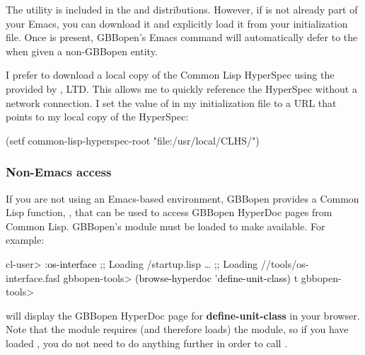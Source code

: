 \documentclass[10pt,twoside,english,pdftex]{article}
\begin{document}
The
utility is included in the
 and
 distributions.
However, if  is not already part of your Emacs, you
can download it and explicitly load it from your  initialization
file.  Once  is present, GBBopen's
 Emacs command will automatically defer to the
 when given a
non-GBBopen entity.

I prefer to download a local copy of the Common Lisp HyperSpec using the
provided by , LTD.  This allows
me to quickly reference the HyperSpec without a network connection.  I set the
value of  in my 
initialization file to a URL that points to my local copy of the HyperSpec:
%
\W\supp
\begin{example}
  (setf common-lisp-hyperspec-root "file:/usr/local/CLHS/")
\end{example}

\subsubsection*{Non-Emacs access}

%
If you are not using an Emacs-based environment, GBBopen provides a Common
Lisp function, , that can be used to access
GBBopen HyperDoc pages from Common Lisp.  GBBopen's
 module must be loaded to make
 available.  For example:
%
\W\supp
\begin{smallexample}
\textcolor{darkergray}{%
  cl-user> \textcolor{black}{:os-interface}
  ;; Loading /startup.lisp
     \textrm{\ldots{}}
  ;; Loading //tools/os-interface.fasl
  gbbopen-tools> \textcolor{black}{(browse-hyperdoc 'define-unit-class)}
  t
  gbbopen-tools>}
\end{smallexample}
%
will display the GBBopen HyperDoc page for \textbf{define-unit-class} in your
browser.  Note that the  module requires (and
therefore loads) the  module, so if you have loaded
, you do not need to do anything further in order
to call .
\end{document}
